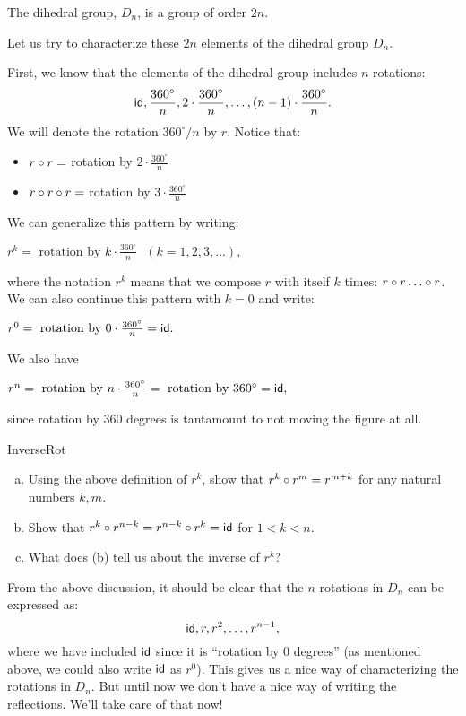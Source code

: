  
\begin{prop}{}
The dihedral group, $D_n$, is a group of order $2n$.
\end{prop}
 

Let us try to characterize these $2n$ elements of the dihedral group $D_n$. 
\medskip

First, we know that the elements of the dihedral group includes $n$ rotations:
\[
{\sf{i}d}, \frac{360^{\circ} }{n}, 2 \cdot \frac{360^{\circ} }{n},
\ldots, (n-1) \cdot \frac{360^{\circ} }{n}.
\]
We will denote the rotation $360^{\circ} /n$ by $r$. Notice that:
\begin{itemize}
\item
$r \circ r = $ rotation by  $2 \cdot \frac{360^{\circ} }{n}$
\item
$r \circ r \circ r = $ rotation by  $3 \cdot \frac{360^{\circ} }{n}$
\end{itemize}

\noindent
We can generalize this pattern by writing:
\medskip

$r^k = \mbox{ rotation by } k \cdot \frac{360^{\circ} }{n}~~~(k=1,2,3,\ldots),$
\medskip

\noindent
where the notation $r^k$ means that we compose  $r$ with itself $k$ times: $r \circ r \ldots \circ r$.
We can also continue this pattern with $k=0$ and  write:
\medskip

$r^0 = \mbox{ rotation by } 0 \cdot \frac{360^{\circ} }{n} = \sf{id}.$
\medskip

We also have
\medskip

$r^n = \mbox{ rotation by } n \cdot \frac{360^{\circ} }{n} = \mbox{ rotation by } 360^{\circ} = {\sf{i}d},$
\medskip

\noindent
since rotation by 360 degrees is tantamount to not moving the figure at all.


\begin{exercise}{InverseRot}
\begin{enumerate}[(a)]
\item
Using the above definition of $r^k$, show that $r^k \circ r^m = r^{m+k}$ for any natural numbers $k,m$.
\item
Show that $r^k \circ r^{n-k} = r^{n-k} \circ r^k = {\sf{i}d}$
 for $1 < k < n$.  
\item
What does (b) tell us about the inverse of $r^k$?
\end{enumerate}
\end{exercise}

From the above discussion, it should be clear that the $n$ rotations in $D_n$ can be expressed as:
\[{\sf{i}d}, r, r^2, \ldots, r^{n-1},\]
where we have included ${\sf{i}d}$ since it is ``rotation by 0 degrees'' (as mentioned above, we could also write $\sf{id}$ as $r^0$).  This gives us a nice way of characterizing the rotations in $D_n$.  But until now we don't have a nice way of writing the reflections. We'll take care of that now!

